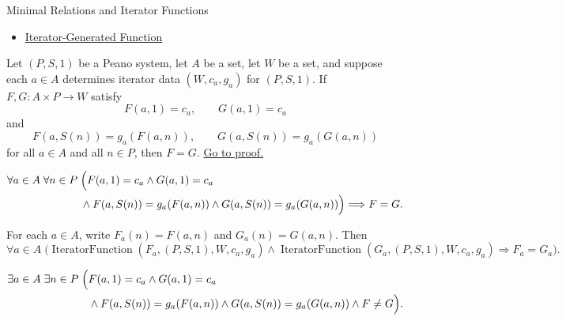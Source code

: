 \begin{topicbox}{Minimal Relations and Iterator Functions}
\begin{remark*}[Dependencies]
\begin{itemize}
  \item \hyperref[def:iterator-generated-function]{Iterator-Generated Function}
\end{itemize}
\end{remark*}

\begin{tcolorbox}[colback=corbox, colframe=corborder, arc=2pt,
  left=6pt, right=6pt, top=4pt, bottom=4pt,
  title={\small\textbf{Corollary (Uniqueness of Binary Iterator Operations)}},
  fonttitle=\small\bfseries]
\begin{corollary}
\label{cor:uniqueness-of-binary-iterator-operations}
Let $(P,S,1)$ be a Peano system, let $A$ be a set, let $W$ be a set, and
suppose each $a\in A$ determines iterator data $(W,c_a,g_a)$ for $(P,S,1)$.
If $F,G:A\times P\to W$ satisfy
\[
F(a,1)=c_a,\qquad G(a,1)=c_a
\]
and
\[
F(a,S(n))=g_a(F(a,n)),
\qquad
G(a,S(n))=g_a(G(a,n))
\]
for all $a\in A$ and all $n\in P$, then $F=G$.
\hyperref[prf:uniqueness-of-binary-iterator-operations]{Go to proof.}
\end{corollary}
\end{tcolorbox}

\begin{remark*}
\[
\begin{aligned}
\forall a\in A\;\forall n\in P\;&\Bigl(
F(a,1)=c_a\land G(a,1)=c_a\\
&\land F(a,S(n))=g_a(F(a,n))
\land G(a,S(n))=g_a(G(a,n))\Bigr)
\Longrightarrow F=G.
\end{aligned}
\]
\end{remark*}

\begin{remark*}
For each $a\in A$, write $F_a(n)=F(a,n)$ and $G_a(n)=G(a,n)$. Then
\[
\forall a\in A\;
\bigl(\operatorname{IteratorFunction}(F_a,(P,S,1),W,c_a,g_a)
\land \operatorname{IteratorFunction}(G_a,(P,S,1),W,c_a,g_a)
\Longrightarrow F_a=G_a\bigr).
\]
\end{remark*}

\begin{remark*}
\[
\begin{aligned}
\exists a\in A\;\exists n\in P\;\Bigl(&
F(a,1)=c_a\land G(a,1)=c_a\\
&\land F(a,S(n))=g_a(F(a,n))
\land G(a,S(n))=g_a(G(a,n))
\land F\neq G\Bigr).
\end{aligned}
\]
\end{remark*}


\end{topicbox}
